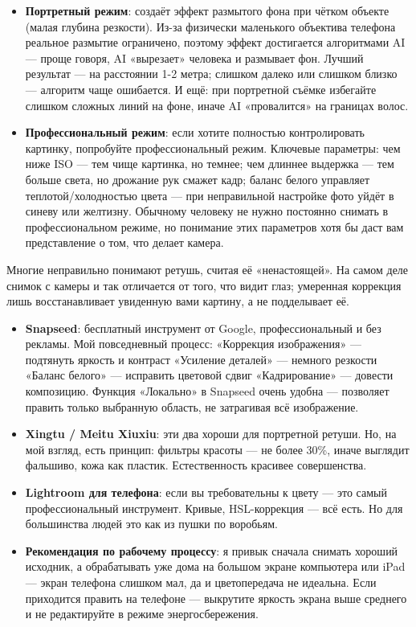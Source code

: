 \begin{itemize}
  \item \textbf{Портретный режим}: создаёт эффект размытого фона при чётком объекте (малая глубина резкости). Из-за физически маленького объектива телефона реальное размытие ограничено, поэтому эффект достигается алгоритмами AI — проще говоря, AI «вырезает» человека и размывает фон. Лучший результат — на расстоянии 1-2 метра; слишком далеко или слишком близко — алгоритм чаще ошибается. И ещё: при портретной съёмке избегайте слишком сложных линий на фоне, иначе AI «провалится» на границах волос.
  \item \textbf{Профессиональный режим}: если хотите полностью контролировать картинку, попробуйте профессиональный режим. Ключевые параметры: чем ниже ISO — тем чище картинка, но темнее; чем длиннее выдержка — тем больше света, но дрожание рук смажет кадр; баланс белого управляет теплотой/холодностью цвета — при неправильной настройке фото уйдёт в синеву или желтизну. Обычному человеку не нужно постоянно снимать в профессиональном режиме, но понимание этих параметров хотя бы даст вам представление о том, что делает камера.
\end{itemize}


Многие неправильно понимают ретушь, считая её «ненастоящей». На самом деле снимок с камеры и так отличается от того, что видит глаз; умеренная коррекция лишь восстанавливает увиденную вами картину, а не подделывает её.

\begin{itemize}
  \item \textbf{Snapseed}: бесплатный инструмент от Google, профессиональный и без рекламы. Мой повседневный процесс: «Коррекция изображения» — подтянуть яркость и контраст «Усиление деталей» — немного резкости «Баланс белого» — исправить цветовой сдвиг «Кадрирование» — довести композицию. Функция «Локально» в Snapseed очень удобна — позволяет править только выбранную область, не затрагивая всё изображение.
  \item \textbf{Xingtu / Meitu Xiuxiu}: эти два хороши для портретной ретуши. Но, на мой взгляд, есть принцип: фильтры красоты — не более 30\%, иначе выглядит фальшиво, кожа как пластик. Естественность красивее совершенства.
  \item \textbf{Lightroom для телефона}: если вы требовательны к цвету — это самый профессиональный инструмент. Кривые, HSL-коррекция — всё есть. Но для большинства людей это как из пушки по воробьям.
  \item \textbf{Рекомендация по рабочему процессу}: я привык сначала снимать хороший исходник, а обрабатывать уже дома на большом экране компьютера или iPad — экран телефона слишком мал, да и цветопередача не идеальна. Если приходится править на телефоне — выкрутите яркость экрана выше среднего и не редактируйте в режиме энергосбережения.
\end{itemize}

